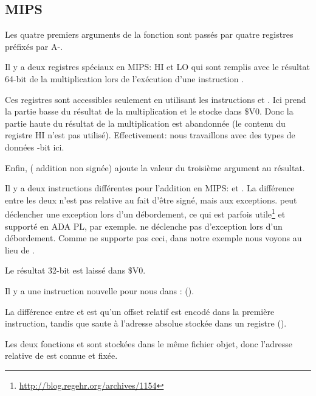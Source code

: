 ﻿\subsection{MIPS}



Les quatre premiers arguments de la fonction sont passés par quatre registres préfixés
par A-.


Il y a deux registres spéciaux en MIPS: HI et LO qui sont remplis avec le résultat
64-bit de la multiplication lors de l'exécution d'une instruction .

Ces registres sont accessibles seulement en utilisant les instructions  et .
Ici  prend la partie basse du résultat de la multiplication et le stocke
dans \$V0.
Donc la partie haute du résultat de la multiplication est abandonnée (le contenu
du registre HI n'est pas utilisé).
Effectivement: nous travaillons avec des types de données -bit ici.


Enfin,  ( addition non signée) ajoute la valeur du troisième
argument au résultat.


Il y a deux instructions différentes pour l'addition en MIPS:  et .
La différence entre les deux n'est pas relative au fait d'être signé, mais aux
exceptions.  peut déclencher une exception lors d'un débordement, ce qui
est parfois utile\footnote{\url{http://blog.regehr.org/archives/1154}} et supporté en ADA
\ac{PL}, par exemple.
 ne déclenche pas d'exception lors d'un débordement.
Comme \CCpp ne supporte pas ceci, dans notre exemple nous voyons  au lieu
de .

Le résultat 32-bit est laissé dans \$V0.


Il y a une instruction nouvelle pour nous dans \main:  ().

La différence entre  et  est qu'un offset relatif est encodé
dans la première instruction, tandis que  saute à l'adresse absolue stockée
dans un registre ().

Les deux fonctions \ttf et \main sont stockées dans le même fichier objet, donc
l'adresse relative de \ttf est connue et fixée.

